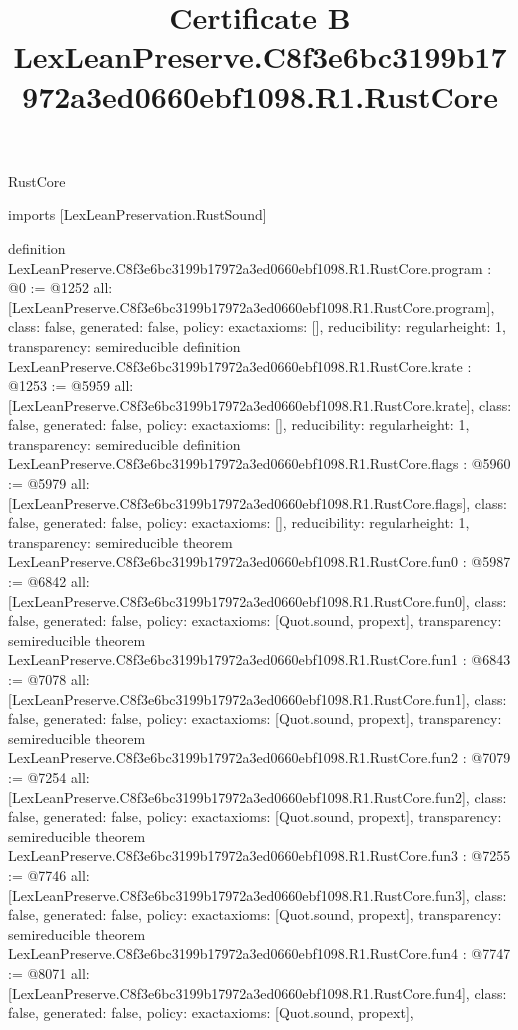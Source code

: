 \begin{lexlean}{RustCore}
\title{Certificate B LexLeanPreserve.C8f3e6bc3199b17972a3ed0660ebf1098.R1.RustCore}
\begin{coremodule}
imports [LexLeanPreservation.RustSound]

definition LexLeanPreserve.C8f3e6bc3199b17972a3ed0660ebf1098.R1.RustCore.program : @0 := @1252 {
  all: [LexLeanPreserve.C8f3e6bc3199b17972a3ed0660ebf1098.R1.RustCore.program],
  class: false,
  generated: false,
  policy: exact{axioms: []},
  reducibility: regular{height: 1},
  transparency: semireducible
}
definition LexLeanPreserve.C8f3e6bc3199b17972a3ed0660ebf1098.R1.RustCore.krate : @1253 := @5959 {
  all: [LexLeanPreserve.C8f3e6bc3199b17972a3ed0660ebf1098.R1.RustCore.krate],
  class: false,
  generated: false,
  policy: exact{axioms: []},
  reducibility: regular{height: 1},
  transparency: semireducible
}
definition LexLeanPreserve.C8f3e6bc3199b17972a3ed0660ebf1098.R1.RustCore.flags : @5960 := @5979 {
  all: [LexLeanPreserve.C8f3e6bc3199b17972a3ed0660ebf1098.R1.RustCore.flags],
  class: false,
  generated: false,
  policy: exact{axioms: []},
  reducibility: regular{height: 1},
  transparency: semireducible
}
theorem LexLeanPreserve.C8f3e6bc3199b17972a3ed0660ebf1098.R1.RustCore.fun0 : @5987 := @6842 {
  all: [LexLeanPreserve.C8f3e6bc3199b17972a3ed0660ebf1098.R1.RustCore.fun0],
  class: false,
  generated: false,
  policy: exact{axioms: [Quot.sound, propext]},
  transparency: semireducible
}
theorem LexLeanPreserve.C8f3e6bc3199b17972a3ed0660ebf1098.R1.RustCore.fun1 : @6843 := @7078 {
  all: [LexLeanPreserve.C8f3e6bc3199b17972a3ed0660ebf1098.R1.RustCore.fun1],
  class: false,
  generated: false,
  policy: exact{axioms: [Quot.sound, propext]},
  transparency: semireducible
}
theorem LexLeanPreserve.C8f3e6bc3199b17972a3ed0660ebf1098.R1.RustCore.fun2 : @7079 := @7254 {
  all: [LexLeanPreserve.C8f3e6bc3199b17972a3ed0660ebf1098.R1.RustCore.fun2],
  class: false,
  generated: false,
  policy: exact{axioms: [Quot.sound, propext]},
  transparency: semireducible
}
theorem LexLeanPreserve.C8f3e6bc3199b17972a3ed0660ebf1098.R1.RustCore.fun3 : @7255 := @7746 {
  all: [LexLeanPreserve.C8f3e6bc3199b17972a3ed0660ebf1098.R1.RustCore.fun3],
  class: false,
  generated: false,
  policy: exact{axioms: [Quot.sound, propext]},
  transparency: semireducible
}
theorem LexLeanPreserve.C8f3e6bc3199b17972a3ed0660ebf1098.R1.RustCore.fun4 : @7747 := @8071 {
  all: [LexLeanPreserve.C8f3e6bc3199b17972a3ed0660ebf1098.R1.RustCore.fun4],
  class: false,
  generated: false,
  policy: exact{axioms: [Quot.sound, propext]},
}
\end{coremodule}
\end{lexlean}
